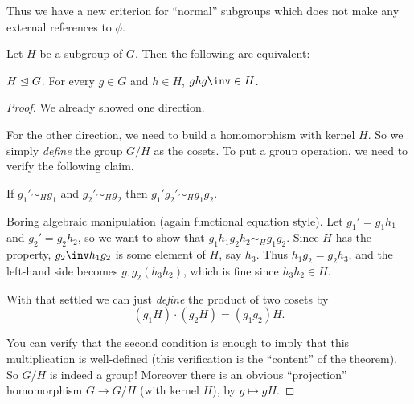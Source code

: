 Thus we have a new criterion for ``normal'' subgroups which does not
make any external references to $\phi$.
\begin{theorem}
	Let $H$ be a subgroup of $G$.
	Then the following are equivalent:
	\begin{itemize}
		\ii $H \trianglelefteq G$.
		\ii For every $g \in G$ and $h \in H$, $ghg\inv \in H$.
	\end{itemize}
\end{theorem}
\begin{proof}
	We already showed one direction.

	For the other direction, we need to build a homomorphism with kernel $H$.
	So we simply \emph{define} the group $G/H$ as the cosets.
	To put a group operation, we need to verify the following claim.
	\begin{claim}
		If $g_1' \sim_H g_1$ and $g_2' \sim_H g_2$ then $g_1'g_2' \sim_H g_1g_2$.
	\end{claim}
	\begin{subproof}
		Boring algebraic manipulation (again functional equation style).
		Let $g_1' = g_1h_1$ and $g_2' = g_2h_2$, so we want to show that
		$g_1h_1g_2h_2 \sim_H g_1g_2$.
		Since $H$ has the property, $g_2\inv h_1g_2$ is some element of $H$, say $h_3$.
		Thus $h_1 g_2 = g_2 h_3$, and the left-hand side becomes $g_1g_2(h_3h_2)$,
		which is fine since $h_3h_2 \in H$.
	\end{subproof}
	With that settled we can just \emph{define} the
	product of two cosets by \[ (g_1H) \cdot (g_2H) = (g_1g_2)H. \]

	You can verify that the second condition is enough to imply
	that this multiplication is well-defined (this verification is the ``content'' of the theorem).
	So $G/H$ is indeed a group!
	Moreover there is an obvious ``projection'' homomorphism
	$G \to G/H$ (with kernel $H$), by $g \mapsto gH$.
\end{proof}


